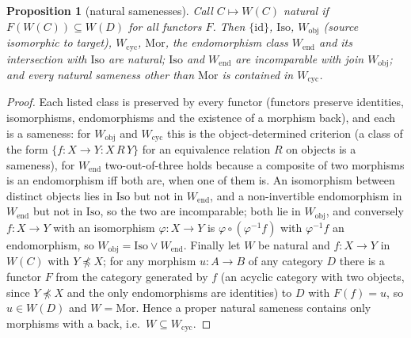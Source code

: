 \documentclass[11pt]{amsart}
\newtheorem{prop}[thm]{Proposition}
\theoremstyle{definition}
\newcommand{\Mor}{\mathrm{Mor}}
\newcommand{\Iso}{\mathrm{Iso}}
\newcommand{\Wcyc}{W_{\mathrm{cyc}}}
\begin{document}
\begin{prop}[natural samenesses]\label{prop:natural}
Call $C\mapsto W(C)$ natural if $F(W(C))\subseteq W(D)$ for all functors $F$.
Then $\{\mathrm{id}\}$, $\Iso$, $W_{\mathrm{obj}}$ (source isomorphic to target), $\Wcyc$,
$\Mor$, the endomorphism class $W_{\mathrm{end}}$ and its intersection with
$\Iso$ are natural; $\Iso$ and $W_{\mathrm{end}}$ are incomparable with join
$W_{\mathrm{obj}}$; and every natural sameness other than $\Mor$ is contained in
$\Wcyc$.
\end{prop}
\begin{proof}
Each listed class is preserved by every functor (functors preserve identities,
isomorphisms, endomorphisms and the existence of a morphism back), and each is
a sameness: for $W_{\mathrm{obj}}$ and $\Wcyc$ this is the object-determined
criterion (a class of the form $\{f\colon X\to Y: X\,R\,Y\}$ for an equivalence
relation $R$ on objects is a sameness), for $W_{\mathrm{end}}$ two-out-of-three
holds because a composite of two morphisms is an endomorphism iff both are,
when one of them is. An isomorphism between distinct objects lies in $\Iso$
but not in $W_{\mathrm{end}}$, and a non-invertible endomorphism in
$W_{\mathrm{end}}$ but not in $\Iso$, so the two are incomparable; both lie in
$W_{\mathrm{obj}}$, and conversely $f\colon X\to Y$ with an isomorphism
$\varphi\colon X\to Y$ is $\varphi\circ(\varphi^{-1}f)$ with $\varphi^{-1}f$ an
endomorphism, so $W_{\mathrm{obj}}=\Iso\vee W_{\mathrm{end}}$. Finally let $W$
be natural and $f\colon X\to Y$ in $W(C)$ with $Y\not\preceq X$; for any
morphism $u\colon A\to B$ of any category $D$ there is a functor $F$ from the
category generated by $f$ (an acyclic category with two objects, since
$Y\not\preceq X$ and the only endomorphisms are identities) to $D$ with
$F(f)=u$, so $u\in W(D)$ and $W=\Mor$. Hence a proper natural sameness
contains only morphisms with a back, i.e.\ $W\subseteq\Wcyc$.
\end{proof}
\end{document}
